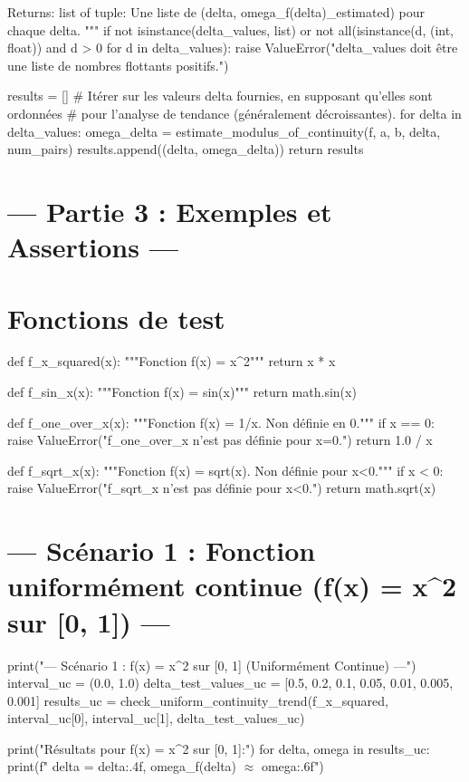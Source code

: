 \documentclass[12pt,a4paper]{report}
\begin{document}
    Returns:
        list of tuple: Une liste de (delta, omega\_f(delta)\_estimated) pour chaque delta.
    """
    if not isinstance(delta\_values, list) or not all(isinstance(d, (int, float)) and d > 0 for d in delta\_values):
        raise ValueError("delta\_values doit être une liste de nombres flottants positifs.")

    results = []
    \# Itérer sur les valeurs delta fournies, en supposant qu'elles sont ordonnées
    \# pour l'analyse de tendance (généralement décroissantes).
    for delta in delta\_values:
        omega\_delta = estimate\_modulus\_of\_continuity(f, a, b, delta, num\_pairs)
        results.append((delta, omega\_delta))
    return results

\section{--- Partie 3 : Exemples et Assertions ---}

\section{Fonctions de test}
def f\_x\_squared(x):
    """Fonction f(x) = x\textasciicircum 2"""
    return x * x

def f\_sin\_x(x):
    """Fonction f(x) = sin(x)"""
    return math.sin(x)

def f\_one\_over\_x(x):
    """Fonction f(x) = 1/x. Non définie en 0."""
    if x == 0:
        raise ValueError("f\_one\_over\_x n'est pas définie pour x=0.")
    return 1.0 / x

def f\_sqrt\_x(x):
    """Fonction f(x) = sqrt(x). Non définie pour x<0."""
    if x < 0:
        raise ValueError("f\_sqrt\_x n'est pas définie pour x<0.")
    return math.sqrt(x)

\section{--- Scénario 1 : Fonction uniformément continue (f(x) = x\textasciicircum 2 sur [0, 1]) ---}
print("--- Scénario 1 : f(x) = x\textasciicircum 2 sur [0, 1] (Uniformément Continue) ---")
interval\_uc = (0.0, 1.0)
delta\_test\_values\_uc = [0.5, 0.2, 0.1, 0.05, 0.01, 0.005, 0.001]
results\_uc = check\_uniform\_continuity\_trend(f\_x\_squared, interval\_uc[0], interval\_uc[1], delta\_test\_values\_uc)

print("Résultats pour f(x) = x\textasciicircum 2 sur [0, 1]:")
for delta, omega in results\_uc:
    print(f"  delta = {delta:.4f}, omega\_f(delta) $\approx$ {omega:.6f}")
\end{document}
